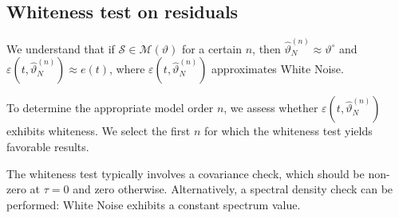 \subsection{Whiteness test on residuals}
We understand that if $\mathcal{S} \in \mathcal{M}(\vartheta)$ for a certain $n$, then $\hat{\vartheta}_N^{(n)} \approx \vartheta^\circ$ and $\varepsilon(t,\hat{\vartheta}_N^{(n)})\approx e(t)$, where $\varepsilon(t,\hat{\vartheta}_N^{(n)})$ approximates  White Noise.

To determine the appropriate model order $n$, we assess whether $\varepsilon(t,\hat{\vartheta}_N^{(n)})$ exhibits whiteness. 
We select the first $n$ for which the whiteness test yields favorable results.

The whiteness test typically involves a covariance check, which should be non-zero at $\tau=0$ and zero otherwise. 
Alternatively, a spectral density check can be performed:  White Noise exhibits a constant spectrum value.

